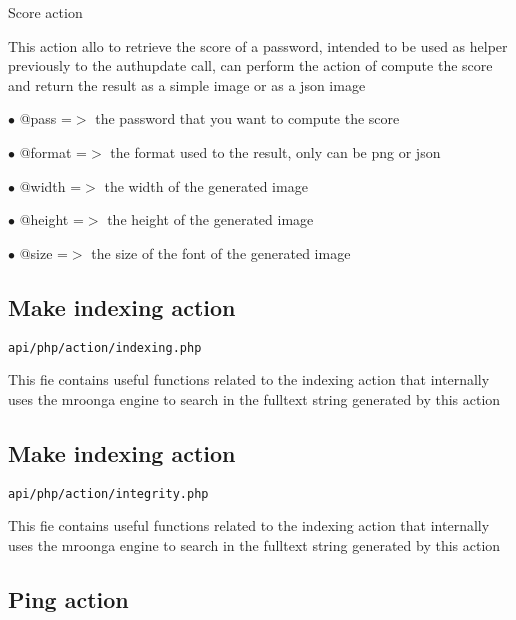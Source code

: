 \documentclass[a4paper]{article}
\begin{document}
Score action

This action allo to retrieve the score of a password, intended to be used
as helper previously to the authupdate call, can perform the action of
compute the score and return the result as a simple image or as a json
image

\begin{compactitem}
\item[\color{myblue}$\bullet$] @pass   =$>$ the password that you want to compute the score
\item[\color{myblue}$\bullet$] @format =$>$ the format used to the result, only can be png or json
\end{compactitem}

\begin{compactitem}
\item[\color{myblue}$\bullet$] @width  =$>$ the width of the generated image
\item[\color{myblue}$\bullet$] @height =$>$ the height of the generated image
\item[\color{myblue}$\bullet$] @size   =$>$ the size of the font of the generated image
\end{compactitem}

\hypertarget{toc8}{}
\subsection{Make indexing action}

\begin{lstlisting}
api/php/action/indexing.php
\end{lstlisting}

This fie contains useful functions related to the indexing action that internally uses the
mroonga engine to search in the fulltext string generated by this action

\hypertarget{toc9}{}
\subsection{Make indexing action}

\begin{lstlisting}
api/php/action/integrity.php
\end{lstlisting}

This fie contains useful functions related to the indexing action that internally uses the
mroonga engine to search in the fulltext string generated by this action

\hypertarget{toc10}{}
\subsection{Ping action}
\end{document}
